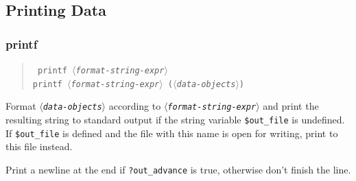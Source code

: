 \documentclass[12pt]{book}
\newenvironment{syntax}%
  {\begin{quote}
   \begin{flushleft}\tt}%
  {\end{flushleft}
   \end{quote}}
\newcommand{\var}[1]{$\langle$\textit{#1}$\rangle$}
\newcommand{\ttt}[1]{\texttt{#1}}
\begin{document}
\subsection{Printing Data}

\subsubsection{printf}
\begin{syntax}
printf \var{format-string-expr} \\
printf \var{format-string-expr} (\var{data-objects})
\end{syntax}
Format \ttt{\var{data-objects}} according to \ttt{\var{format-string-expr}}
and print the resulting string to standard output if the string variable
\ttt{\$out\_file} is undefined.  If \ttt{\$out\_file} is defined and the file
with this name is open for writing, print to this file instead.

Print a newline at the end if \ttt{?out\_advance} is true, otherwise don't
finish the line.
\end{document}
